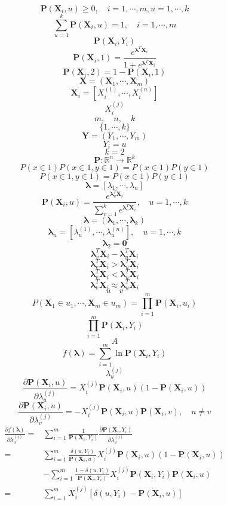 \documentclass[a4paper,12pt]{article}
\begin{document}
$$\textbf{P}(\textbf{X}_i,u)\geq0, \quad i=1,\cdots,m,u=1,\cdots,k$$
$$\sum_{u=1}^k\textbf{P}(\textbf{X}_i,u)=1,\quad i=1,\cdots,m$$
$$\textbf{P}(\textbf{X}_i,Y_i)$$
$$\textbf{P}(\textbf{X}_i,1)=\frac{e^{\boldsymbol\lambda^T \textbf{X}_i}}{1+e^{\boldsymbol\lambda^T \textbf{X}_i}}$$
$$\textbf{P}(\textbf{X}_i,2)=1-\textbf{P}(\textbf{X}_i,1)$$
$$\textbf{X}=\left(\textbf{X}_1,\cdots,\textbf{X}_m\right)$$
$$\textbf{X}_i=\left[X_i^{(1)},\cdots,X_i^{(n)}\right]$$
$$X_i^{(j)}$$
$$m,\quad n,\quad k$$
$$\{1,\cdots,k\}$$
$$\textbf{Y}=(Y_1,\cdots,Y_m)$$
$$Y_i=u$$
$$k=2$$
$$\textbf{P}:\mathbb{R}^n\to\mathbb{R}^k$$
$$P(x\in1)P(x\in1,y\in1)=P(x\in1)P(y\in1)$$
$$P(x\in1,y\in1)=P(x\in1)P(y\in1)$$
$$\boldsymbol\lambda=[\lambda_1,\cdots,\lambda_n]$$
$$\textbf{P}(\textbf{X}_i,u)=\frac{e^{\boldsymbol\lambda_u^T\textbf{X}_i}}{\sum_{v=1}^k e^{\boldsymbol\lambda_v^T\textbf{X}_i}},\quad u=1,\cdots,k$$
$$\boldsymbol\lambda=(\boldsymbol\lambda_1,\cdots,\boldsymbol\lambda_k)$$
$$\boldsymbol\lambda_u=\left[\lambda_u^{(1)},\cdots,\lambda_u^{(n)}\right],\quad u=1,\cdots,k$$
$$\boldsymbol\lambda_2=\textbf{0}$$
$$\boldsymbol\lambda_v^T\textbf{X}_i-\boldsymbol\lambda_u^T\textbf{X}_i$$
$$\boldsymbol\lambda_v^T\textbf{X}_i>\boldsymbol\lambda_u^T\textbf{X}_i$$
$$\boldsymbol\lambda_v^T\textbf{X}_i<\boldsymbol\lambda_u^T\textbf{X}_i$$
$$\boldsymbol\lambda_v^T\textbf{X}_i\approx\boldsymbol\lambda_u^T\textbf{X}_i$$
$$u\quad v$$
$$P(\textbf{X}_1\in u_1,\cdots,\textbf{X}_m\in u_m)=\prod_{i=1}^m\textbf{P}(\textbf{X}_i,u_i)$$
$$\prod_{i=1}^m\textbf{P}(\textbf{X}_i,Y_i)$$
$$A$$
$$f(\boldsymbol\lambda)=\sum_{i=1}^m \ln\textbf{P}(\textbf{X}_i,Y_i)$$
$$\lambda_u^{(j)}$$
$$\frac{\partial\textbf{P}(\textbf{X}_i,u)}{\partial\lambda_u^{(j)}}=X_i^{(j)}\textbf{P}(\textbf{X}_i,u)\left(1-\textbf{P}(\textbf{X}_i,u)\right)$$
$$\frac{\partial\textbf{P}(\textbf{X}_i,u)}{\partial\lambda_v^{(j)}}=-X_i^{(j)}\textbf{P}(\textbf{X}_i,u)\textbf{P}(\textbf{X}_i,v),\quad u\neq v$$
\begin{align}
\frac{\partial f(\boldsymbol\lambda)}{\partial\lambda_u^{(j)}}=
&\sum_{i=1}^m\frac{1}{\textbf{P}(\textbf{X}_i,Y_i)}\frac{\partial\textbf{P}(\textbf{X}_i,Y_i)}{\partial\lambda_u^{(j)}}\\=
&\sum_{i=1}^m\frac{\delta(u,Y_i)}{\textbf{P}(\textbf{X}_i,u)}X_i^{(j)}\textbf{P}(\textbf{X}_i,u)\left(1-\textbf{P}(\textbf{X}_i,u)\right)\\
&-\sum_{i=1}^m\frac{1-\delta(u,Y_i)}{\textbf{P}(\textbf{X}_i,Y_i)}X_i^{(j)}\textbf{P}(\textbf{X}_i,Y_i)\textbf{P}(\textbf{X}_i,u)\\=
&\sum_{i=1}^m X_i^{(j)}\left[\delta(u,Y_i)-\textbf{P}(\textbf{X}_i,u)\right]
\end{align}
\end{document}
